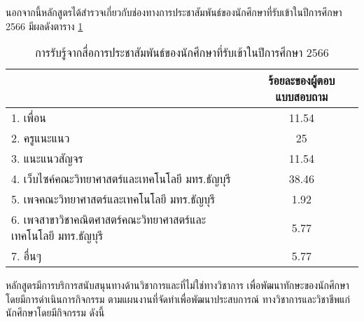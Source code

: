   นอกจากนี้หลักสูตรได้สำรวจเกี่ยวกับช่องทางการประชาสัมพันธ์ของนักศึกษาที่รับเข้าในปีการศึกษา 2566 มีผลดังตาราง \ref{table:6.2}
  \newpage
\begin{longtable}{ |>{\raggedright}p{6cm}|c|}
\caption{การรับรู้จากสื่อการประชาสัมพันธ์ของนักศึกษาที่รับเข้าในปีการศึกษา 2566}
\label{table:6.2}\\
 
\hline
\multicolumn{1}{|c|}{{\bf ช่องทางการประชาสัมพันธ์}}     & \multicolumn{1}{c|}{\textbf{ร้อยละของผู้ตอบแบบสอบถาม }}                 \\ \hline
1. เพื่อน  &   11.54\\ 
\hline
2. ครูแนะแนว &   25 \\ 
\hline
3. แนะแนวสัญจร &   11.54 \\ 
\hline
4. เว็บไซค์คณะวิทยาศาสตร์และเทคโนโลยี มทร.ธัญบุรี &  38.46  \\ 
\hline
5. เพจคณะวิทยาศาสตร์และเทคโนโลยี มทร.ธัญบุรี   &   1.92 \\ 
\hline
6. เพจสาขาวิชาคณิตศาสตร์คณะวิทยาศาสตร์และเทคโนโลยี มทร.ธัญบุรี &  5.77  \\ 
\hline
7. อื่นๆ  & 5.77  \\ 
\hline
\end{longtable}

    
 
 \begin{doclist}
 \end{doclist}




หลักสูตรมีการบริการสนับสนุนทางด้านวิชาการและที่ไม่ใช่ทางวิชาการ เพื่อพัฒนาทักษะของนักศึกษาโดยมีการดำเนินการกิจกรรม ตามแผนงานที่จัดทำเพื่อพัฒนาประสบการณ์ ทางวิชาการและวิชาชีพแก่ นักศึกษาโดยมีกิจกรรม ดังนี้\\

